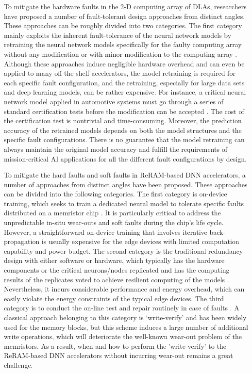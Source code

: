 To mitigate the hardware faults in the 2-D computing array of DLAs, researchers have proposed a number of fault-tolerant design approaches from distinct angles. These approaches can be roughly divided into two categories. The first category mainly exploits the inherent fault-tolerance of the neural network models by retraining the neural network models specifically for the faulty computing array without any modification or with minor modification to the computing array \cite{deng2015retraining, zhang2019fault, xu2019resilient, li2019squeezing}. Although these approaches induce negligible hardware overhead and can even be applied to many off-the-shelf accelerators, the model retraining is required for each specific fault configuration, and the retraining, especially for large data sets and deep learning models, can be rather expensive. For instance, a critical neural network model applied in automotive systems must go through a series of standard certification tests before the modification can be accepted \cite{validation2019Ebert}. The cost of the certification test is nontrivial and time-consuming. Moreover, the prediction accuracy of the retrained models depends on both the model structures and the specific fault configurations. There is no guarantee that the model retraining can always maintain the original model accuracy and fulfill the requirements of mission-critical AI applications for all the different fault configurations by design.


To mitigate the hard faults and soft faults in ReRAM-based DNN accelerators, a number of approaches from distinct angles have been proposed. These approaches can be divided into the following categories. The first category is on-device training, which seeks to train a dedicated neural model to tolerate specific faults distributed on a memristor chip \cite{7167198}. It is particularly critical to address the unpredictable in-situ wear-outs and soft faults during the chip's life cycle. However, a straightforward on-device training that involves iterative back-propagation is usually expensive for the edge devices with limited computation capability and power budget. The second category is the traditional redundancy design with either software or hardware, which typically has the hardware components or the critical neurons/nodes replicated and has the computing results of the replicates voted to achieve resilient computing of the models \cite{5726731}. Nevertheless, it incurs considerable performance and energy overhead, which can easily violate the energy constraints of the typical edge devices. The third category is to conduct the on-line test and repair routinely in case of faults \cite{6725492}. A classical approach belonging to this category is `write-verify' and has been widely used for the memory blocks, but this scheme induces a large number of additional write operations, which will deteriorate the well-known wear-out problem of the memristors. As a result, when and how to perform the 'write-verify' to the ReRAM-based DNN accelerators without incurring wear-out remains a great challenge.

